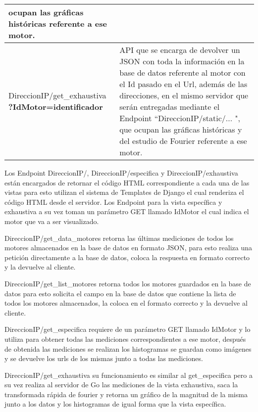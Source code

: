 \begin{table}[ht]
\begin{center}
\begin{tabular}{|p{5cm}|p{10cm}|}
                ocupan las gráficas históricas referente a ese motor.
                \\\hline
                DireccionIP/get\_exhaustiva \textbf{?IdMotor=identificador}&
                API que se encarga de devolver un JSON con toda la información
                en la base de datos referente al motor con el Id pasado en el
                Url, además de las direcciones, en el mismo servidor que serán
                entregadas mediante el Endpoint ``DireccionIP/static/... ", que
                ocupan las gráficas históricas y del estudio de Fourier
                referente a ese motor.
                \\\hline
            \end{tabular}

        \end{center}

    \end{table}

    Los Endpoint DireccionIP/, DireccionIP/especifica y DireccionIP/exhaustiva
    están encargados de retornar el código HTML correspondiente a cada una de
    las vistas  para esto utilizan el sistema de Templates de Django el cual
    renderiza el código HTML desde el servidor. Los Endpoint para la vista
    específica y exhaustiva a su vez toman un parámetro GET llamado IdMotor el
    cual indica el motor que va a ser visualizado.

    DireccionIP/get\_data\_motores retorna las últimas mediciones de todos los
    motores almacenados en la base de datos en formato JSON, para esto realiza
    una petición directamente a la base de datos, coloca la respuesta en
    formato correcto y la devuelve al cliente.

    DireccionIP/get\_list\_motores retorna todos los motores guardados en la base
    de datos para esto solicita el campo en la base de datos que contiene la
    lista de todos los motores almacenados, la coloca en el formato correcto y
    la devuelve al cliente.

    DireccionIP/get\_especifica requiere de un parámetro GET llamado IdMotor y
    lo utiliza para obtener todas las mediciones correspondientes a ese motor,
    después de obtenida las mediciones se realizan los histogramas se guardan
    como imágenes y se devuelve los urls de los mismas junto a todas las
    mediciones.

    DireccionIP/get\_exhaustiva su funcionamiento es similar al get\_especifica
    pero a su vez realiza al servidor de Go las mediciones de la vista
    exhaustiva, saca la transformada rápida de fourier y retorna un gráfico de
    la magnitud de la misma junto a los datos y los histogramas de igual forma
    que la vista específica.


